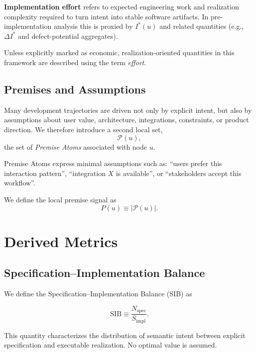 \documentclass[twocolumn]{aastex701}
\begin{document}
\textbf{Implementation effort} refers to expected engineering work and
realization complexity required to turn intent into stable software artifacts.
In pre-implementation analysis this is proxied by $I^\ast(u)$ and related
quantities (e.g., $\Delta I^\ast$ and defect-potential aggregates).

Unless explicitly marked as economic, realization-oriented quantities in this
framework are described using the term \emph{effort}.

\subsection{Premises and Assumptions}

Many development trajectories are driven not only by explicit intent,
but also by assumptions about user value, architecture, integrations,
constraints, or product direction.
We therefore introduce a second local set,
\begin{equation}
\mathcal{P}(u),
\end{equation}
the set of \emph{Premise Atoms} associated with node $u$.

Premise Atoms express minimal assumptions such as:
“users prefer this interaction pattern”, “integration $X$ is available”,
or “stakeholders accept this workflow”.

We define the local premise signal as
\begin{equation}
P(u) \equiv |\mathcal{P}(u)|.
\end{equation}

\section{Derived Metrics}

\subsection{Specification--Implementation Balance}

We define the Specification--Implementation Balance (SIB) as

\begin{equation}
\mathrm{SIB} \equiv \frac{N_{\mathrm{spec}}}{S_{\mathrm{impl}}}.
\end{equation}

This quantity characterizes the distribution of semantic intent
between explicit specification and executable realization.
No optimal value is assumed.
\end{document}
